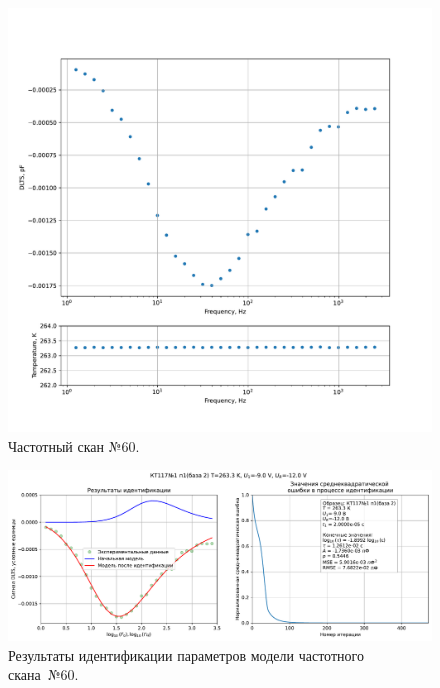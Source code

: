 \begin{figure}[!ht]
    \centering
    \includegraphics[width=1\textwidth]{../plots/КТ117№1_п1(база 2)_2500Гц-1Гц_1пФ_-10С_-9В-12В_50мВ_20мкс_шаг_0,1.pdf}
    \caption{Частотный скан №60.}
    \label{pic:frequency_scan_60}
\end{figure}

\begin{figure}[!ht]
    \centering
    \includegraphics[width=1\textwidth]{../plots/КТ117№1_п1(база 2)_2500Гц-1Гц_1пФ_-10С_-9В-12В_50мВ_20мкс_шаг_0,1_model.pdf}
    \caption{Результаты идентификации параметров модели частотного скана~№60.}
    \label{pic:frequency_scan_model60}
\end{figure}

\pagebreak


